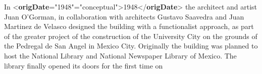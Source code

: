 \begin{shaded}
\hspace*{1em}\hspace*{1em}\mbox{}\newline 
\hspace*{1em}\mbox{}\newline 
{}\mbox{}\newline 
{}\mbox{}\newline 
\hspace*{1em} In {<\textbf{origDate}\hspace*{1em}{when}="{1948}"\hspace*{1em}{type}="{conceptual}">}1948{</\textbf{origDate}>} the architect and artist Juan O'Gorman, in\mbox{}\newline 
\hspace*{1em}\hspace*{1em}\hspace*{1em}\hspace*{1em} collaboration with architects Gustavo Saavedra and Juan Martinez de Velasco designed the building with a\mbox{}\newline 
\hspace*{1em}\hspace*{1em}\hspace*{1em}\hspace*{1em} functionalist approach, as part of the greater project of the construction of the University City on the\mbox{}\newline 
\hspace*{1em}\hspace*{1em}\hspace*{1em}\hspace*{1em} grounds of the Pedregal de San Angel in Mexico City. Originally the building was planned to host the National\mbox{}\newline 
\hspace*{1em}\hspace*{1em}\hspace*{1em}\hspace*{1em} Library and National Newspaper Library of Mexico. The library finally opened its doors for the first time on\mbox{}\newline 

\end{shaded}
